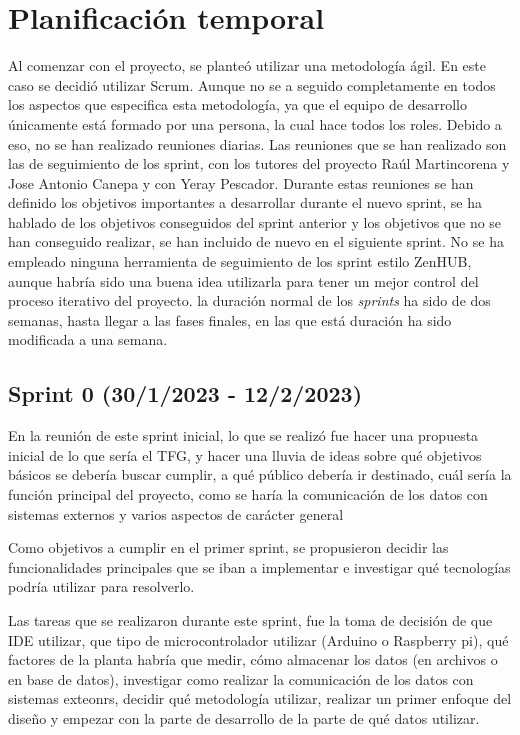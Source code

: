 \section{Planificación temporal}
Al comenzar con el proyecto, se planteó utilizar una metodología ágil. En este caso se decidió utilizar Scrum. Aunque no se a seguido completamente en todos los aspectos que especifica esta metodología, ya que el equipo de desarrollo únicamente está formado por una persona, la cual hace todos los roles. Debido a eso, no se han realizado reuniones diarias. Las reuniones que se han realizado son las de seguimiento de los sprint, con los tutores del proyecto Raúl Martincorena y Jose Antonio Canepa y con Yeray Pescador. Durante estas reuniones se han definido los objetivos importantes a desarrollar durante el nuevo sprint, se ha hablado de los objetivos conseguidos del sprint anterior y los objetivos que no se han conseguido realizar, se han incluido de nuevo en el siguiente sprint. No se ha empleado ninguna herramienta de seguimiento de los sprint estilo ZenHUB, aunque habría sido una buena idea utilizarla para tener un mejor control del proceso iterativo del proyecto. la duración normal de los \textit{sprints} ha sido de dos semanas, hasta llegar a las fases finales, en las que está duración ha sido modificada a una semana.

\subsection{Sprint 0 (30/1/2023 - 12/2/2023)}

En la reunión de este sprint inicial, lo que se realizó fue hacer una propuesta inicial de lo que sería el TFG, y hacer una lluvia de ideas sobre qué objetivos básicos se debería buscar cumplir, a qué público debería ir destinado, cuál sería la función principal del proyecto, como se haría la comunicación de los datos con sistemas externos y varios aspectos de carácter general

Como objetivos a cumplir en el primer sprint, se propusieron decidir las funcionalidades principales que se iban a implementar e investigar qué tecnologías podría utilizar para resolverlo. 

Las tareas que se realizaron durante este sprint, fue la toma de decisión de que IDE utilizar, que tipo de microcontrolador utilizar (Arduino o Raspberry pi), qué factores de la planta habría que medir, cómo almacenar los datos (en archivos o en base de datos), investigar como realizar la comunicación de los datos con sistemas exteonrs, decidir qué metodología utilizar, realizar un primer enfoque del diseño y empezar con la parte de desarrollo de la parte de qué datos utilizar.

